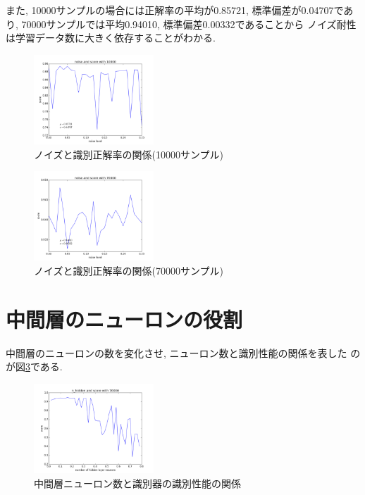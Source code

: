 \documentclass[10pt,a4paper,twocolumn]{jarticle}
\begin{document}
また, 10000サンプルの場合には正解率の平均が0.85721, 標準偏差が0.04707であり, 
70000サンプルでは平均0.94010, 標準偏差0.00332であることから
ノイズ耐性は学習データ数に大きく依存することがわかる. 
\begin{figure}[htbp] 
  \centering
  \includegraphics[width=0.4\textwidth]{assets/img/noise_test_mnist_10000.pdf}
  \caption{ノイズと識別正解率の関係(10000サンプル)}
  \label{fig:noise-test-score-var-10000}
\end{figure}
\begin{figure}[htbp] 
  \centering
  \includegraphics[width=0.4\textwidth]{assets/img/noise_test_mnist_70000.pdf}
  \caption{ノイズと識別正解率の関係(70000サンプル)}
  \label{fig:noise-test-score-var-70000}
\end{figure}

\section{中間層のニューロンの役割}
中間層のニューロンの数を変化させ, ニューロン数と識別性能の関係を表した
のが図\ref{fig:hidden-neuron-role}である. 
\begin{figure}[htbp]
  \centering
  \includegraphics[width=0.4\textwidth]{assets/img/hidden_layer_analyze_mnist_score_70000.pdf}
  \caption{中間層ニューロン数と識別器の識別性能の関係}
  \label{fig:hidden-neuron-role}
\end{figure}
\end{document}
